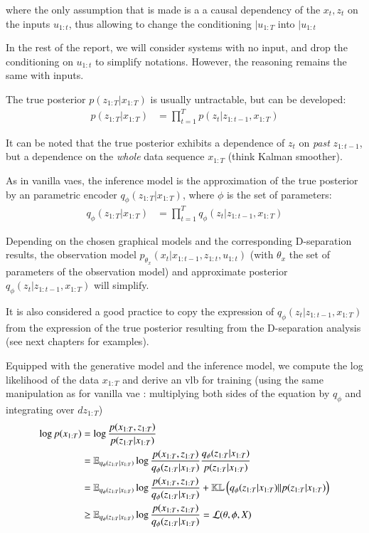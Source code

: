 where the only assumption that is made is a a causal dependency of the $x_t, z_t$ on the inputs $u_{1:t}$, thus allowing to change the conditioning $\vert u_{1:T}$ into $\vert u_{1:t}$

In the rest of the report, we will consider systems with no input, and drop the conditioning on $u_{1:t}$ to simplify notations. However, the reasoning remains the same with inputs.

The true posterior  $p(z_{1:T} \vert x_{1:T})$ is usually untractable, but can be developed:
\begin{align*}
    p(z_{1:T} \vert x_{1:T}) &= \prod_{t=1}^T p(z_t \vert z_{1:t-1}, x_{1:T})
\end{align*}

It can be noted that the true posterior exhibits a dependence of $z_t$ on \textit{past} $z_{1:t-1}$, but a dependence on the \textit{whole} data sequence $x_{1:T}$ (think Kalman smoother).

As in vanilla \glspl{vae}, the inference model is the approximation of the true posterior by an parametric encoder $q_{\phi}(z_{1:T} \vert x_{1:T})$, where $\phi$ is the set of parameters:
\begin{align*}
    q_{\phi}(z_{1:T} \vert x_{1:T}) &= \prod_{t=1}^T q_\phi(z_t \vert z_{1:t-1}, x_{1:T})
\end{align*}

Depending on the chosen graphical models and the corresponding D-separation results, the observation model $p_{\theta_x}(x_t \vert x_{1:t-1}, z_{1:t}, u_{1:t})$ (with $\theta_x$ the set of parameters of the observation model) and approximate posterior $q_\phi(z_t \vert z_{1:t-1}, x_{1:T})$ will simplify. 

It is also considered a good practice to copy the expression of $q_\phi(z_t \vert z_{1:t-1}, x_{1:T})$ from the expression of the true posterior resulting from the D-separation analysis (see next chapters for examples).

Equipped with the generative model and the inference model, we compute the log likelihood of the data $x_{1:T}$ and derive an \gls{vlb} for training (using the same manipulation as for vanilla \gls{vae} : multiplying both sides of the equation by $q_\phi$ and integrating over $dz_{1:T}$)
\begin{align}
    \log{p(x_{1:T})} &= \log{\frac{p(x_{1:T}, z_{1:T})}{p(z_{1:T} \vert x_{1:T})}} \\
    &= \mathbb{E}_{q_{\phi}(z_{1:T}\vert x_{1:T})} \log{\frac{p(x_{1:T}, z_{1:T})}{q_{\phi}(z_{1:T}\vert x_{1:T})} \frac{q_{\phi}(z_{1:T}\vert x_{1:T})}{p(z_{1:T} \vert x_{1:T})}} \\
    &= \mathbb{E}_{q_{\phi}(z_{1:T}\vert x_{1:T})} \log{\frac{p(x_{1:T}, z_{1:T})}{q_{\phi}(z_{1:T}\vert x_{1:T})} + \mathbb{KL}\left( q_{\phi}(z_{1:T}\vert x_{1:T}) \vert\vert p(z_{1:T} \vert x_{1:T}) \right)} \\
    &\geq \mathbb{E}_{q_{\phi}(z_{1:T}\vert x_{1:T})} \log{\frac{p(x_{1:T}, z_{1:T})}{q_{\phi}(z_{1:T}\vert x_{1:T})}} = \mathcal{L}(\theta, \phi, X)
\end{align}

